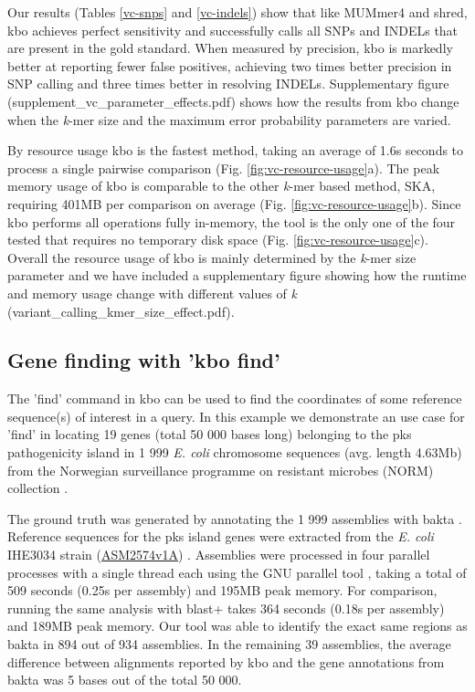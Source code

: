 \documentclass[unnumsec,webpdf,contemporary,large]{oup-authoring-template}%
\theoremstyle{thmstyleone}%
\theoremstyle{thmstyletwo}%
\theoremstyle{thmstylethree}%
\begin{document}
Our results (Tables \ref{vc-snps} and \ref{vc-indels}) show that like MUMmer4 and shred, {\sf kbo} achieves perfect sensitivity and successfully calls all SNPs and INDELs that are present in the gold standard. When measured by precision, {\sf kbo} is markedly better at reporting fewer false positives, achieving two times better precision in SNP calling and three times better in resolving INDELs. Supplementary figure (supplement\_vc\_parameter\_effects.pdf) shows how the results from {\sf kbo} change when the \emph{k}-mer size and the maximum error probability parameters are varied.

By resource usage {\sf kbo} is the fastest method, taking an average of 1.6s seconds to process a single pairwise comparison (Fig. \ref{fig:vc-resource-usage}a). The peak memory usage of {\sf kbo} is comparable to the other \emph{k}-mer based method, SKA, requiring 401MB per comparison on average (Fig. \ref{fig:vc-resource-usage}b). Since {\sf kbo} performs all operations fully in-memory, the tool is the only one of the four tested that requires no temporary disk space (Fig. \ref{fig:vc-resource-usage}c). Overall the resource usage of {\sf kbo} is mainly determined by the \emph{k}-mer size parameter and we have included a supplementary figure showing how the runtime and memory usage change with different values of \emph{k} (variant\_calling\_kmer\_size\_effect.pdf).

\subsection{Gene finding with 'kbo find'}
The 'find' command in {\sf kbo} can be used to find the coordinates of some reference sequence(s) of interest in a query. In this example we demonstrate an use case for 'find' in locating 19 genes (total 50 000 bases long) belonging to the pks pathogenicity island in 1 999 \textit{E. coli} chromosome sequences (avg. length 4.63Mb) from the Norwegian surveillance programme on resistant microbes (NORM) collection \cite{gladstone2021emergence, arredondo2023escherichia}.

The ground truth was generated by annotating the 1 999 assemblies with bakta \cite{schwengers2021bakta}. Reference sequences for the pks island genes were extracted from the \textit{E. coli} IHE3034 strain (\href{https://www.ebi.ac.uk/ena/browser/view/GCA_000025745.1}{ASM2574v1A}) \cite{moriel2010identification}. Assemblies were processed in four parallel processes with a single thread each using the GNU parallel tool \cite{tange_2024_13826092}, taking a total of 509 seconds (0.25s per assembly) and 195MB peak memory. For comparison, running the same analysis with blast+ \cite{camacho2009blast+} takes 364 seconds (0.18s per assembly) and 189MB peak memory. Our tool was able to identify the exact same regions as bakta in 894 out of 934 assemblies. In the remaining 39 assemblies, the average difference between alignments reported by {\sf kbo} and the gene annotations from bakta was 5 bases out of the total 50 000.
\end{document}
